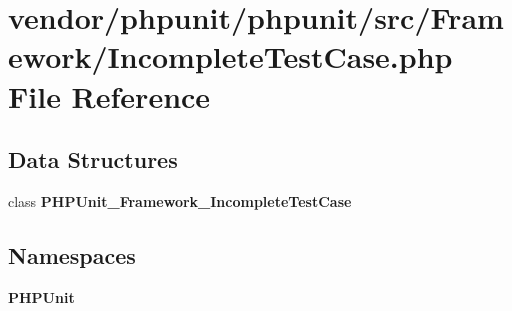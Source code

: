 \section{vendor/phpunit/phpunit/src/\+Framework/\+Incomplete\+Test\+Case.php File Reference}
\label{_incomplete_test_case_8php}
\subsection*{Data Structures}
\begin{DoxyCompactItemize}
\item 
class {\bf P\+H\+P\+Unit\+\_\+\+Framework\+\_\+\+Incomplete\+Test\+Case}
\end{DoxyCompactItemize}
\subsection*{Namespaces}
\begin{DoxyCompactItemize}
\item 
 {\bf P\+H\+P\+Unit}
\end{DoxyCompactItemize}
